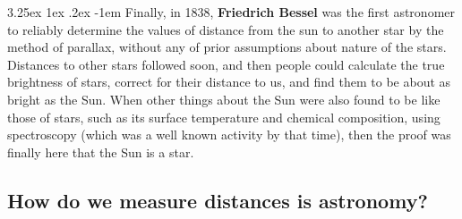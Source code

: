 \documentclass[a4paper,twoside,11pt]{article}
\makeatletter
\numberwithin{equation}{section}
\renewcommand\paragraph{\@startsection{paragraph}{5}{\z@}%
  {3.25ex \@plus1ex \@minus.2ex}%
  {-1em}%
  {\normalfont\normalsize\bfseries}}
\makeatother
\begin{document}
\paragraph{}
Finally, in 1838, \textbf{Friedrich Bessel} was the first astronomer to reliably determine the values of distance from the sun to another star by the method of parallax, without any of prior assumptions about nature of the stars. Distances to other stars followed soon, and then people could calculate the true brightness of stars, correct for their distance to us, and find them to be about as bright as the Sun. When other things about the Sun were also found to be like those of stars, such as its surface temperature and chemical composition, using spectroscopy (which was a well known activity by that time), then the proof was finally here that the Sun is a star.

\newpage
\subsection{How do we measure distances is astronomy?}
\end{document}
